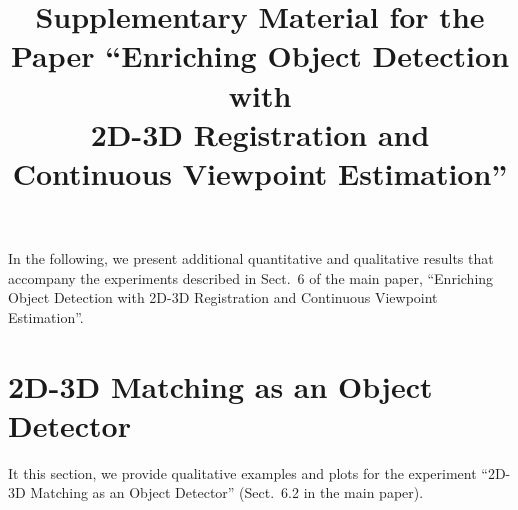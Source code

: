 \documentclass[10pt,twocolumn,letterpaper]{article}
\begin{document}
\title{Supplementary Material for the Paper ``Enriching Object Detection with\\
2D-3D Registration and Continuous Viewpoint Estimation''}


\maketitle

In the following, we present additional quantitative and qualitative
results that accompany the experiments described in Sect.~6 of the
main paper, ``Enriching Object Detection with 2D-3D Registration and
Continuous Viewpoint Estimation''.

\section{2D-3D Matching as an Object Detector}
\label{sect:3dobject}
It this section, we provide qualitative examples and plots for the experiment
``2D-3D Matching as an Object Detector'' (Sect.~6.2 in the main
paper).
\end{document}
